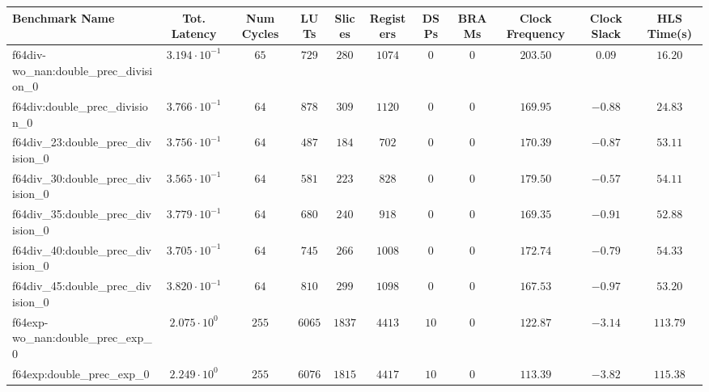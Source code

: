 \begin{tabular}{|l|c|c|c|c|c|c|c|c|c|c|}
\hline
Benchmark Name                                 & Tot. Latency            & Num Cycles & LUTs       & Slices    & Registers  & DSPs    & BRAMs & Clock Frequency & Clock Slack & HLS Time(s) \\
\hline
f64div-wo\_nan:double\_prec\_division\_0       & $ 3.194 \cdot 10^{-1} $ & $ 65     $ & $ 729    $ & $ 280   $ & $ 1074   $ & $ 0   $ & $ 0 $ & $ 203.50      $ & $ 0.09    $ & $ 16.20   $ \\
f64div:double\_prec\_division\_0               & $ 3.766 \cdot 10^{-1} $ & $ 64     $ & $ 878    $ & $ 309   $ & $ 1120   $ & $ 0   $ & $ 0 $ & $ 169.95      $ & $ -0.88   $ & $ 24.83   $ \\
f64div\_23:double\_prec\_division\_0           & $ 3.756 \cdot 10^{-1} $ & $ 64     $ & $ 487    $ & $ 184   $ & $ 702    $ & $ 0   $ & $ 0 $ & $ 170.39      $ & $ -0.87   $ & $ 53.11   $ \\
f64div\_30:double\_prec\_division\_0           & $ 3.565 \cdot 10^{-1} $ & $ 64     $ & $ 581    $ & $ 223   $ & $ 828    $ & $ 0   $ & $ 0 $ & $ 179.50      $ & $ -0.57   $ & $ 54.11   $ \\
f64div\_35:double\_prec\_division\_0           & $ 3.779 \cdot 10^{-1} $ & $ 64     $ & $ 680    $ & $ 240   $ & $ 918    $ & $ 0   $ & $ 0 $ & $ 169.35      $ & $ -0.91   $ & $ 52.88   $ \\
f64div\_40:double\_prec\_division\_0           & $ 3.705 \cdot 10^{-1} $ & $ 64     $ & $ 745    $ & $ 266   $ & $ 1008   $ & $ 0   $ & $ 0 $ & $ 172.74      $ & $ -0.79   $ & $ 54.33   $ \\
f64div\_45:double\_prec\_division\_0           & $ 3.820 \cdot 10^{-1} $ & $ 64     $ & $ 810    $ & $ 299   $ & $ 1098   $ & $ 0   $ & $ 0 $ & $ 167.53      $ & $ -0.97   $ & $ 53.20   $ \\
f64exp-wo\_nan:double\_prec\_exp\_0            & $ 2.075 \cdot 10^{0}  $ & $ 255    $ & $ 6065   $ & $ 1837  $ & $ 4413   $ & $ 10  $ & $ 0 $ & $ 122.87      $ & $ -3.14   $ & $ 113.79  $ \\
f64exp:double\_prec\_exp\_0                    & $ 2.249 \cdot 10^{0}  $ & $ 255    $ & $ 6076   $ & $ 1815  $ & $ 4417   $ & $ 10  $ & $ 0 $ & $ 113.39      $ & $ -3.82   $ & $ 115.38  $ \\

\end{tabular}
